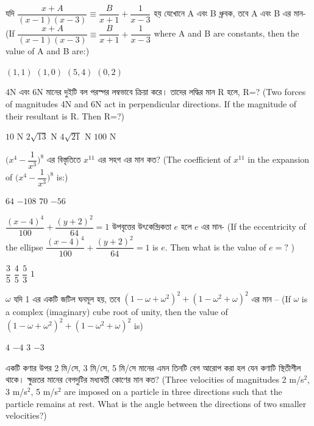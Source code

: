 \documentclass[addpoints]{exam}
\begin{document}
\begin{questions}
 \question  যদি  $ \dfrac{x+A}{(x-1)(x-3)} \equiv \dfrac{B}{x+1} + \dfrac{1}{x-3} $ হয় যেখোনে A এবং B  ধ্রুবক, তবে A এবং B এর মান- (If $ \dfrac{x+A}{(x-1)(x-3)} \equiv \dfrac{B}{x+1} + \dfrac{1}{x-3} $ where A and B are constants, then the value of A and B are:)

\begin{oneparchoices}
\choice $ (1,1) $
\choice $ (1, 0) $
\choice $ (5,4) $
\choice  $ (0,2) $
\end{oneparchoices}

\question 4N এবং 6N মানের দুইটি বল পরস্পর লম্বভাবে ক্রিয়া করে। তাদের লদ্ধির মান R হলে, R=? (Two forces of magnitudes 4N and 6N act in perpendicular directions. If the magnitude of their resultant is R. Then R=?)

\begin{oneparchoices}
\choice $ 10 $ N
\choice  $ 2\sqrt{13} $ N
\choice $ 4\sqrt{21} $ N
\choice $ 100 $ N  
\end{oneparchoices}


\question $ \Big(x^{4}-\dfrac{1}{x^{3}}\Big)^{8} $ এর বিস্তৃতিতে $ x^{11} $ এর সহগ এর মান কত? (The coefficient of $ x^{11} $ in the expansion of $ \Big(x^{4}-\dfrac{1}{x^{3}}\Big)^{8} $ is:)

\begin{oneparchoices}
\choice $ 64 $
\choice $ -108 $
\choice $ 70 $
\choice $ -56 $
\end{oneparchoices}

\question  $ \dfrac{(x-4)^{4}}{100} + \dfrac{(y+2)^{2}}{64} =1 $ উপবৃত্তের উৎকেন্দ্রিকতা $ e $ হলে $ e $ এর মান- (If the eccentricity of the ellipse $ \dfrac{(x-4)^{4}}{100} + \dfrac{(y+2)^{2}}{64} =1 $ is $ e $. Then what is the value of $ e=? $ ) 

\begin{oneparchoices}
\choice $ \dfrac{3}{5} $
\choice $ \dfrac{4}{5} $
\choice $ \dfrac{5}{3} $
\choice $ 1 $
\end{oneparchoices}

\question $ \omega $ যদি 1 এর একটি জটিল ঘনমূল হয়, তবে $ (1-\omega +\omega^{2})^{2}+(1-\omega^{2}+\omega)^{2} $ এর মান – (If $ \omega $ is a complex (imaginary) cube root of unity, then the value of $ (1-\omega +\omega^{2})^{2}+(1-\omega^{2}+\omega)^{2} $ is)
 
\begin{oneparchoices}
\choice $ 4 $
\choice $ -4 $
\choice $ 3 $
\choice $ -3 $
\end{oneparchoices}

\question একটি কণার উপর 2 মি/সে, 3 মি/সে, 5 মি/সে মানের এমন তিনটি বেগ আরোপ করা হল যেন কণাটি স্থিতীশীল থাকে। ক্ষুদ্রতর মানের বেগদুটির মধ্যবর্তী কোণের মান কত? (Three velocities of magnitudes 2 m/s$ ^{2} $, 3 m/s$ ^{2} $, 5 m/s$ ^{2} $ are imposed on a particle in three directions such that the particle remains at rest. What is the angle between the directions of two smaller velocities?)


\end{questions}
\end{document}
